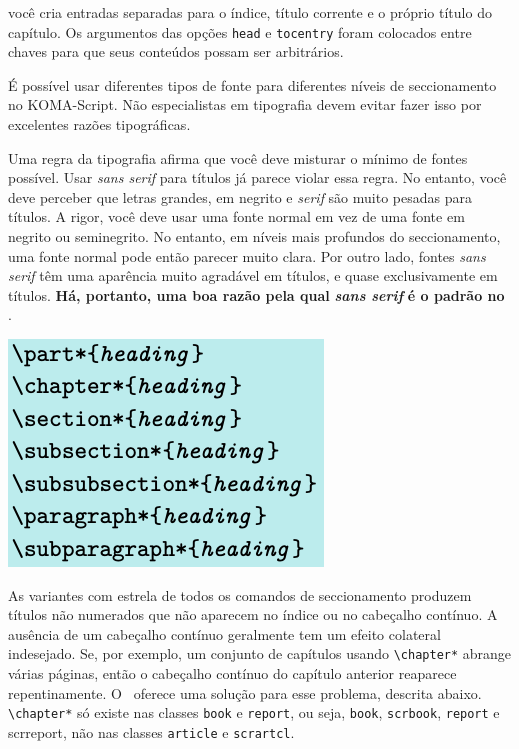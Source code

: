 você cria entradas separadas para o índice, título corrente e o próprio título do capítulo. Os argumentos das opções \texttt{head} e \texttt{tocentry} foram colocados entre chaves para que seus conteúdos possam ser arbitrários.

É possível usar diferentes tipos de fonte para diferentes níveis de seccionamento no KOMA-Script. Não especialistas em tipografia devem evitar fazer isso por excelentes razões tipográficas.

Uma regra da tipografia afirma que você deve misturar o mínimo de fontes possível. Usar \textit{sans serif} para títulos já parece violar essa regra. No entanto, você deve perceber que letras grandes, em negrito e \textit{serif} são muito pesadas para títulos. A rigor, você deve usar uma fonte normal em vez de uma fonte em negrito ou seminegrito. No entanto, em níveis mais profundos do seccionamento, uma fonte normal pode então parecer muito clara. Por outro lado, fontes \textit{sans serif} têm uma aparência muito agradável em títulos, e quase exclusivamente em títulos. \textbf{Há, portanto, uma boa razão pela qual} \textit{\textbf{sans serif}} \textbf{é o padrão no} \KOMAScript.

\includegraphics[width=0.35\linewidth]{imagens/imagem20.png}

As variantes com estrela de todos os comandos de seccionamento produzem títulos não numerados que não aparecem no índice ou no cabeçalho contínuo. A ausência de um cabeçalho contínuo geralmente tem um efeito colateral indesejado. Se, por exemplo, um conjunto de capítulos usando \verb|\chapter*| abrange várias páginas, então o cabeçalho contínuo do capítulo anterior reaparece repentinamente. O \KOMAScript\ oferece uma solução para esse problema, descrita abaixo. \verb|\chapter*| só existe nas classes \texttt{book} e \texttt{report}, ou seja, \texttt{book}, \texttt{scrbook}, \texttt{report} e scrreport, não nas classes \texttt{article} e \texttt{scrartcl}.


